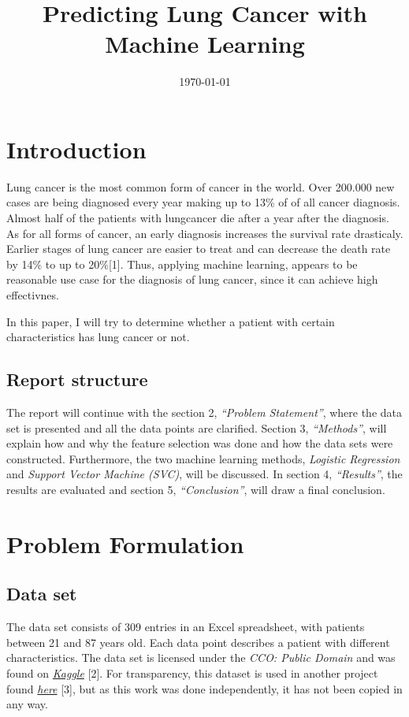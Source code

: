 \documentclass[a4paper,12pt]{article}
\date{\today}
\title{Predicting Lung Cancer with Machine Learning}
\begin{document}
\maketitle
\section{Introduction}
\label{sec:org167e442}
Lung cancer is the most common form of cancer in the world. Over 200.000 new cases are being diagnosed every year making up to 13\% of of all cancer diagnosis. Almost half of the patients with lungcancer die after a year after the diagnosis.
As for all forms of cancer, an early diagnosis increases the survival rate drasticaly. Earlier stages of lung cancer are easier to treat and can decrease the death rate by 14\% to up to 20\%[1].
Thus, applying machine learning, appears to be reasonable use case for the diagnosis of lung cancer, since it can achieve high effectivnes.

In this paper, I will try to determine whether a patient with certain characteristics has lung cancer or not.

\subsection{Report structure}
\label{sec:orgbbdf0e5}
The report will continue with the section 2, \emph{``Problem Statement''}, where the data set is presented and all the data points are clarified.
Section 3, \emph{``Methods''}, will explain how and why the feature selection was done and how the data sets were constructed.
Furthermore, the two machine learning methods, \emph{Logistic Regression} and \emph{Support Vector Machine (SVC)}, will be discussed.
In section 4, \emph{``Results''}, the results are evaluated and section 5, \emph{``Conclusion''}, will draw a final conclusion.

\section{Problem Formulation}
\label{sec:orgdc55014}

\subsection{Data set}
\label{sec:orgf6bd2ee}
The data set consists of 309 entries in an Excel spreadsheet, with patients between 21 and 87 years old.
Each data point describes a patient with different characteristics.
The data set is licensed under the \emph{CCO: Public Domain} and was found on \emph{\href{https://www.kaggle.com/datasets/mysarahmadbhat/lung-cancer}{Kaggle}} [2].
For transparency, this dataset is used in another project found \emph{\href{https://www.kaggle.com/code/gaganmaahi224/lung-cancer-5ml-models-full-analysis-plotly}{here}} [3], but as this work was done independently, it has not been copied in any way.
\end{document}
